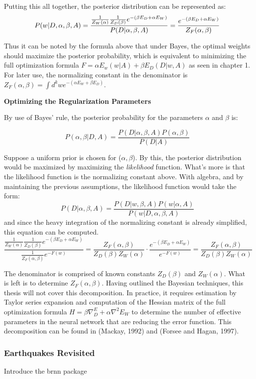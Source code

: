 Putting this all together, the posterior distribution can be represented as:
$$
P(w|D,\alpha,\beta,A) = \frac{\frac{1}{Z_W(\alpha)} \frac{1}{Z_D(\beta)} e^{-(\beta E_D + \alpha E_W)}}{P(D|\alpha,\beta,A)} \\
= \frac{e^{-(\beta E_D + \alpha E_W)}}{Z_F(\alpha,\beta)}
$$

Thus it can be noted by the formula above that under Bayes, the optimal weights should maximize the posterior probability, which is equivalent to minimizing the full optimization formula $F = \alpha E_w(w|A) + \beta E_D(D|w,A)$ as seen in chapter 1.  For later use, the normalizing constant in the denominator is $Z_F(\alpha,\beta) = \int d^k w e^{-(\alpha E_W + \beta E_D)}$.


\textbf{Optimizing the Regularization Parameters}

By use of Bayes' rule, the posterior probability for the parameters $\alpha$ and $\beta$ is:

$$
P(\alpha, \beta | D,A) = \frac{P(D|\alpha,\beta,A) P(\alpha,\beta)}{P(D|A)}
$$



Suppose a uniform prior is chosen for ($\alpha,\beta$).  By this, the posterior distribution would be maximized by maximizing the \textit{likelihood} function.  What's more is that the likelihood function is the normalizing constant above.  With algebra, and by maintaining the previous assumptions, the likelihood function would take the form:
$$
P(D|\alpha,\beta,A) = \frac{P(D|w,\beta,A) P(w|\alpha,A)}{P(w|D,\alpha,\beta,A)}
$$
and since the heavy integration of the normalizing constant is already simplified, this equation can be computed.
$$
\frac{\frac{1}{Z_W(\alpha)} \frac{1}{Z_D(\beta)} e^{-(\beta E_D + \alpha E_W)}}{\frac{1}{Z_F(\alpha,\beta)} e^{-F(w)}} = \frac{Z_F(\alpha,\beta)}{Z_D(\beta) Z_W(\alpha)} \cdot \frac{e^{-(\beta E_D + \alpha E_W)}}{e^{-F(w)}} = \frac{Z_F(\alpha,\beta)}{Z_D(\beta) Z_W(\alpha)}
$$

The denominator is comprised of known constants $Z_D(\beta)$ and $Z_W(\alpha)$.  What is left is to determine $Z_F(\alpha,\beta)$.  Having outlined the Bayesian techniques, this thesis will not cover this decomposition.  In practice, it requires estimation by Taylor series expansion and computation of the Hessian matrix of the full optimization formula $H = \beta \nabla^ E_D + \alpha \nabla^2 E_W$ to determine the number of effective parameters in the neural network that are reducing the error function.  This decomposition can be found in (Mackay, 1992) and (Forsee and Hagan, 1997).


\begin{comment}
Through \textbf{margialization}, the true posterior $P(w|D,A)$ is obtained by integrating out $\alpha$ and $\beta$:
$$
P(w|D,A) = \int P(w|D,\alpha,\beta,A) P(\alpha, \beta | D,A) \text{ } d\alpha \text{ } d\beta
$$
\end{comment}

\subsubsection{Earthquakes Revisited}

Introduce the brnn package

